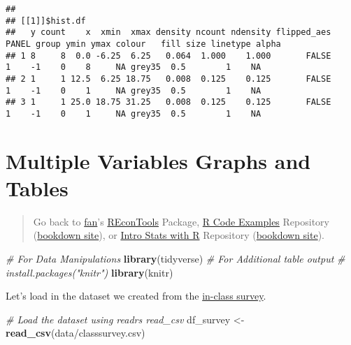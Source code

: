 \documentclass[
]{book}
\newenvironment{Shaded}{\begin{snugshade}}{\end{snugshade}}
\newcommand{\CommentTok}[1]{\textcolor[rgb]{0.56,0.35,0.01}{\textit{#1}}}
\newcommand{\KeywordTok}[1]{\textcolor[rgb]{0.13,0.29,0.53}{\textbf{#1}}}
\newcommand{\NormalTok}[1]{#1}
\newcommand{\StringTok}[1]{\textcolor[rgb]{0.31,0.60,0.02}{#1}}
\begin{document}
\begin{verbatim}
## 
## [[1]]$hist.df
##   y count    x  xmin  xmax density ncount ndensity flipped_aes PANEL group ymin ymax colour   fill size linetype alpha
## 1 8     8  0.0 -6.25  6.25   0.064  1.000    1.000       FALSE     1    -1    0    8     NA grey35  0.5        1    NA
## 2 1     1 12.5  6.25 18.75   0.008  0.125    0.125       FALSE     1    -1    0    1     NA grey35  0.5        1    NA
## 3 1     1 25.0 18.75 31.25   0.008  0.125    0.125       FALSE     1    -1    0    1     NA grey35  0.5        1    NA
\end{verbatim}

\hypertarget{multiple-variables-graphs-and-tables}{%
\section{Multiple Variables Graphs and Tables}\label{multiple-variables-graphs-and-tables}}

\begin{quote}
Go back to \href{http://fanwangecon.github.io/}{fan}'s \href{https://fanwangecon.github.io/REconTools/}{REconTools} Package, \href{https://fanwangecon.github.io/R4Econ/}{R Code Examples} Repository (\href{https://fanwangecon.github.io/R4Econ/bookdown}{bookdown site}), or \href{https://fanwangecon.github.io/Stat4Econ/}{Intro Stats with R} Repository (\href{https://fanwangecon.github.io/Stat4Econ/bookdown}{bookdown site}).
\end{quote}

\begin{Shaded}
\begin{Highlighting}[]
\CommentTok{\# For Data Manipulations}
\KeywordTok{library}\NormalTok{(tidyverse)}
\CommentTok{\# For Additional table output}
\CommentTok{\# install.packages("knitr")}
\KeywordTok{library}\NormalTok{(knitr)}
\end{Highlighting}
\end{Shaded}

Let's load in the dataset we created from the \href{https://fanwangecon.github.io/Stat4Econ/survey/htmlpdfr/classsurvey.html}{in-class survey}.

\begin{Shaded}
\begin{Highlighting}[]
\CommentTok{\# Load the dataset using readr\textquotesingle{}s read\_csv}
\NormalTok{df\_survey \textless{}{-}}\StringTok{ }\KeywordTok{read\_csv}\NormalTok{(}\StringTok{\textquotesingle{}data/classsurvey.csv\textquotesingle{}}\NormalTok{)}
\end{Highlighting}
\end{Shaded}
\end{document}
